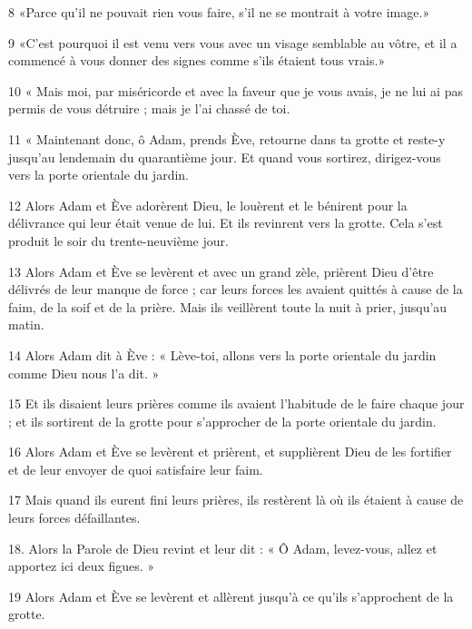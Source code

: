\par 8 «Parce qu'il ne pouvait rien vous faire, s'il ne se montrait à votre image.»

\par 9 «C'est pourquoi il est venu vers vous avec un visage semblable au vôtre, et il a commencé à vous donner des signes comme s'ils étaient tous vrais.»

\par 10 « Mais moi, par miséricorde et avec la faveur que je vous avais, je ne lui ai pas permis de vous détruire ; mais je l'ai chassé de toi.

\par 11 « Maintenant donc, ô Adam, prends Ève, retourne dans ta grotte et reste-y jusqu'au lendemain du quarantième jour. Et quand vous sortirez, dirigez-vous vers la porte orientale du jardin.

\par 12 Alors Adam et Ève adorèrent Dieu, le louèrent et le bénirent pour la délivrance qui leur était venue de lui. Et ils revinrent vers la grotte. Cela s'est produit le soir du trente-neuvième jour.

\par 13 Alors Adam et Ève se levèrent et avec un grand zèle, prièrent Dieu d'être délivrés de leur manque de force ; car leurs forces les avaient quittés à cause de la faim, de la soif et de la prière. Mais ils veillèrent toute la nuit à prier, jusqu'au matin.

\par 14 Alors Adam dit à Ève : « Lève-toi, allons vers la porte orientale du jardin comme Dieu nous l'a dit. »

\par 15 Et ils disaient leurs prières comme ils avaient l'habitude de le faire chaque jour ; et ils sortirent de la grotte pour s'approcher de la porte orientale du jardin.

\par 16 Alors Adam et Ève se levèrent et prièrent, et supplièrent Dieu de les fortifier et de leur envoyer de quoi satisfaire leur faim.

\par 17 Mais quand ils eurent fini leurs prières, ils restèrent là où ils étaient à cause de leurs forces défaillantes.

\par 18. Alors la Parole de Dieu revint et leur dit : « Ô Adam, levez-vous, allez et apportez ici deux figues. »

\par 19 Alors Adam et Ève se levèrent et allèrent jusqu'à ce qu'ils s'approchent de la grotte.

